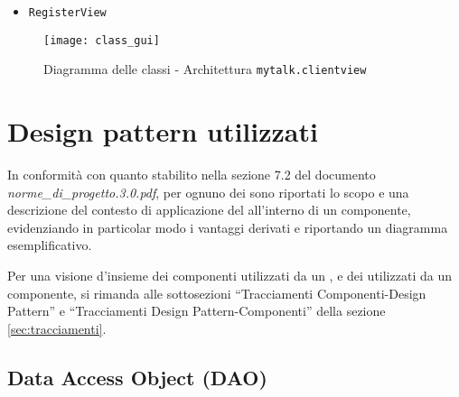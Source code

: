 \begin{itemize}[leftmargin=0em]

\item \texttt{RegisterView}

\end{itemize}

\begin{figure}[H]
  \centering
  \texttt{[image: class\_gui]}
  \caption{Diagramma delle classi - Architettura \texttt{mytalk.clientview}}\label{fig:sottoarchview}
\end{figure}
\clearpage

\section{Design pattern utilizzati}
In conformità con quanto stabilito nella sezione 7.2 del documento \textit{norme\_di\_progetto.3.0.pdf}, per ognuno dei  sono riportati lo scopo e una descrizione del contesto di applicazione del  all'interno di un componente, evidenziando in particolar modo i vantaggi derivati e riportando un diagramma esemplificativo.

Per una visione d'insieme dei componenti utilizzati da un , e dei  utilizzati da un componente, si rimanda alle sottosezioni ``Tracciamenti Componenti-Design Pattern'' e ``Tracciamenti Design Pattern-Componenti'' della sezione \vref{sec:tracciamenti}.

\subsection{Data Access Object (DAO)}\label{sec:patterndao}

